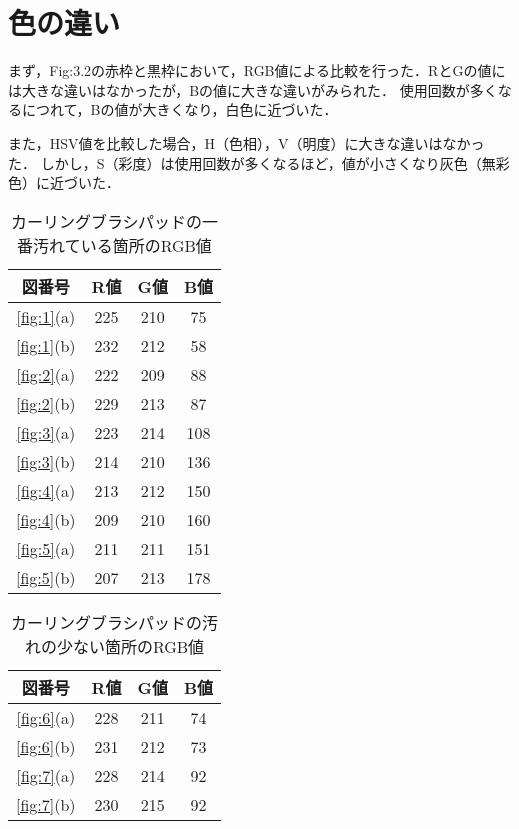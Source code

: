 \documentclass[main]{subfiles}
\begin{document}
\section{色の違い}

まず，Fig:3.2の赤枠と黒枠において，RGB値による比較を行った．RとGの値には大きな違いはなかったが，Bの値に大きな違いがみられた．
使用回数が多くなるにつれて，Bの値が大きくなり，白色に近づいた．

また，HSV値を比較した場合，H（色相），V（明度）に大きな違いはなかった．
しかし，S（彩度）は使用回数が多くなるほど，値が小さくなり灰色（無彩色）に近づいた．


\begin{table}[h]
    \caption{カーリングブラシパッドの一番汚れている箇所のRGB値}
    \label{table:RGB1}
    \centering
\begin{tabular}{c|c|c|c}
    図番号 & R値 & G値 & B値 \\ \hline
    \ref{fig:1}(a) & 225 & 210 & 75 \\ \hline
   \ref{fig:1}(b) & 232 & 212 & 58 \\ \hline\hline
   \ref{fig:2}(a) & 222 & 209 & 88 \\ \hline
   \ref{fig:2}(b) & 229 & 213 & 87 \\ \hline
   \ref{fig:3}(a) & 223 & 214 & 108 \\ \hline
   \ref{fig:3}(b) & 214 & 210 & 136 \\ \hline\hline
   \ref{fig:4}(a) & 213 & 212 & 150 \\ \hline
   \ref{fig:4}(b) & 209 & 210 & 160 \\ \hline
   \ref{fig:5}(a) & 211 & 211 & 151 \\ \hline
   \ref{fig:5}(b) & 207 & 213 & 178 \\ 
\end{tabular}    
\end{table}

\begin{table}[h]
    \caption{カーリングブラシパッドの汚れの少ない箇所のRGB値}
    \label{table:RGB2}
    \centering
\begin{tabular}{c|c|c|c}
    図番号 & R値 & G値 & B値 \\ \hline
   \ref{fig:6}(a) & 228 & 211 & 74 \\ \hline
   \ref{fig:6}(b) & 231 & 212 & 73 \\ \hline\hline
   \ref{fig:7}(a) & 228 & 214 & 92 \\ \hline
   \ref{fig:7}(b) & 230 & 215 & 92 \\ 
\end{tabular}    
\end{table}
\end{document}
